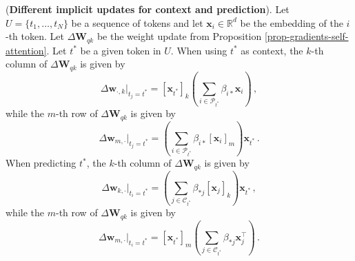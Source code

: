 \begin{proposition}
\label{prop-gradient-columns-rows}
%
(\textbf{Different implicit updates for context and prediction}).
%
%
Let $U = \{t_1, \dots, t_N\}$ be a sequence of tokens and let $\bm{x}_i \in \mathbb{R}^d$ be the embedding of the $i$-th token. 
%
Let $\Delta \bm{W}_{qk}$ be the weight update from Proposition \ref{prop-gradients-self-attention}.
%
Let $t^*$ be a given token in $U$.
%
When using $t^*$ as context, the $k$-th column of $\Delta \bm{W}_{qk}$ is given by
%
\begin{equation}
    \Delta \bm{w}_{\cdot, k} \bigg|_{t_j = t^*}= [\bm{x}_{t^*}]_k \left(\sum_{i \in \mathcal{P}_{t^*}}\beta_{i*}\bm{x}_i\right)\,,
\end{equation}
%
while the $m$-th row of $\Delta \bm{W}_{qk}$ is given by
%
\begin{equation}
    \Delta \bm{w}_{m, \cdot} \bigg|_{t_j = t^*}= \left(\sum_{i \in \mathcal{P}_{t^*}}\beta_{i*}[\bm{x}_i]_m\right)\bm{x}_{t^*} \,.
\end{equation}
%
%
When predicting $t^*$, the $k$-th column of $\Delta \bm{W}_{qk}$ is given by
%
\begin{equation}
    \Delta \bm{w}_{k, \cdot} \bigg|_{t_i = t^*} = \left(\sum_{j \in \mathcal{C}_{t^*}}\beta_{*j}[\bm{x}_j]_k\right)\bm{x}_{t^*} \,,
\end{equation}
%
while the $m$-th row of $\Delta \bm{W}_{qk}$ is given by
%
\begin{equation}
    \Delta \bm{w}_{m, \cdot} \bigg|_{t_i = t^*} = [\bm{x}_{t^*}]_m \left(\sum_{j \in \mathcal{C}_{t^*}}\beta_{*j}\bm{x}_j^\top\right)\,.
\end{equation}
%
%
\end{proposition}
%

